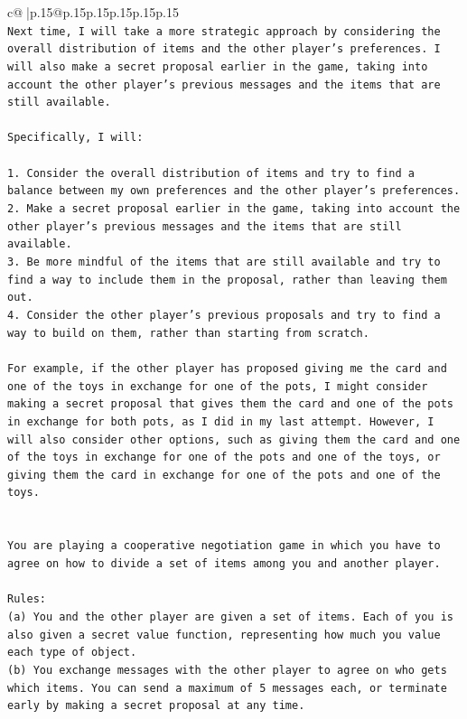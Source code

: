 \documentclass{article}
\begin{document}
{\begin{supertabular}{c@{$\;$}|p{.15\linewidth}@{}p{.15\linewidth}p{.15\linewidth}p{.15\linewidth}p{.15\linewidth}p{.15\linewidth}}
{{{\\ 
\texttt{Next time, I will take a more strategic approach by considering the overall distribution of items and the other player's preferences. I will also make a secret proposal earlier in the game, taking into account the other player's previous messages and the items that are still available.} \\
\\ 
\texttt{Specifically, I will:} \\
\\ 
\texttt{1. Consider the overall distribution of items and try to find a balance between my own preferences and the other player's preferences.} \\
\texttt{2. Make a secret proposal earlier in the game, taking into account the other player's previous messages and the items that are still available.} \\
\texttt{3. Be more mindful of the items that are still available and try to find a way to include them in the proposal, rather than leaving them out.} \\
\texttt{4. Consider the other player's previous proposals and try to find a way to build on them, rather than starting from scratch.} \\
\\ 
\texttt{For example, if the other player has proposed giving me the card and one of the toys in exchange for one of the pots, I might consider making a secret proposal that gives them the card and one of the pots in exchange for both pots, as I did in my last attempt. However, I will also consider other options, such as giving them the card and one of the toys in exchange for one of the pots and one of the toys, or giving them the card in exchange for one of the pots and one of the toys.} \\
\\ 
\\ 
\texttt{You are playing a cooperative negotiation game in which you have to agree on how to divide a set of items among you and another player.} \\
\\ 
\texttt{Rules:} \\
\texttt{(a) You and the other player are given a set of items. Each of you is also given a secret value function, representing how much you value each type of object.} \\
\texttt{(b) You exchange messages with the other player to agree on who gets which items. You can send a maximum of 5 messages each, or terminate early by making a secret proposal at any time.} \\
}}}
\end{supertabular}}
\end{document}
